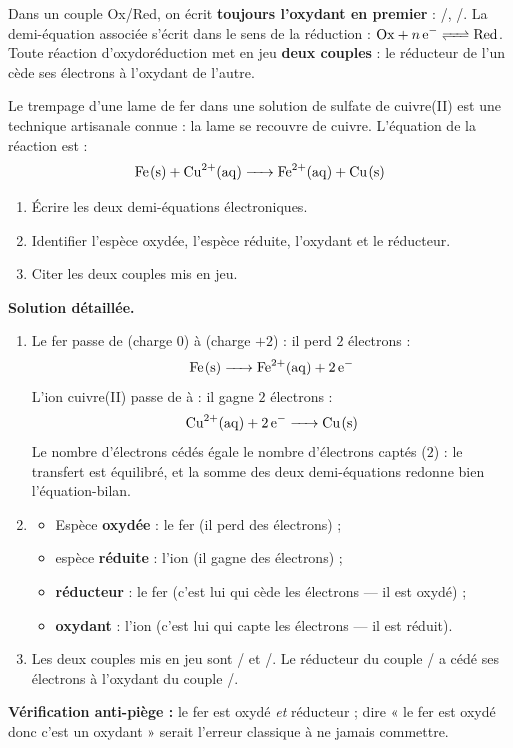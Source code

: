 \documentclass[11pt]{article}
\begin{document}
\begin{aretenir}
Dans un couple Ox/Red, on écrit \textbf{toujours l'oxydant en premier} : /, /. La demi-équation associée s'écrit dans le sens de la réduction : $\ce{Ox + $n$ e- <=> Red}$. Toute réaction d'oxydoréduction met en jeu \textbf{deux couples} : le réducteur de l'un cède ses électrons à l'oxydant de l'autre.
\end{aretenir}

\begin{exoresolu}
Le trempage d'une lame de fer dans une solution de sulfate de cuivre(II) est une technique artisanale connue : la lame se recouvre de cuivre. L'équation de la réaction est :
\[ \ce{Fe(s) + Cu^2+(aq) -> Fe^2+(aq) + Cu(s)} \]
\begin{enumerate}
\item Écrire les deux demi-équations électroniques.
\item Identifier l'espèce oxydée, l'espèce réduite, l'oxydant et le réducteur.
\item Citer les deux couples mis en jeu.
\end{enumerate}
\tcblower
\textbf{Solution détaillée.}
\begin{enumerate}
\item Le fer passe de  (charge $0$) à  (charge $+2$) : il perd $2$ électrons :
\[ \ce{Fe(s) -> Fe^2+(aq) + 2e-} \]
L'ion cuivre(II) passe de  à  : il gagne $2$ électrons :
\[ \ce{Cu^2+(aq) + 2e- -> Cu(s)} \]
Le nombre d'électrons cédés égale le nombre d'électrons captés ($2$) : le transfert est équilibré, et la somme des deux demi-équations redonne bien l'équation-bilan.
\item \begin{itemize}
\item Espèce \textbf{oxydée} : le fer  (il perd des électrons) ;
\item espèce \textbf{réduite} : l'ion  (il gagne des électrons) ;
\item \textbf{réducteur} : le fer  (c'est lui qui cède les électrons — il est oxydé) ;
\item \textbf{oxydant} : l'ion  (c'est lui qui capte les électrons — il est réduit).
\end{itemize}
\item Les deux couples mis en jeu sont / et /. Le réducteur du couple / a cédé ses électrons à l'oxydant du couple /.
\end{enumerate}
\textbf{Vérification anti-piège :} le fer est oxydé \emph{et} réducteur ; dire « le fer est oxydé donc c'est un oxydant » serait l'erreur classique à ne jamais commettre.
\end{exoresolu}
\end{document}
